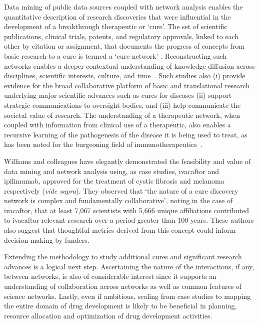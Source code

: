 \documentclass[10pt,letterpaper]{article}
\begin{document}
Data mining of public data sources coupled with network analysis enables the quantitative description of research discoveries that were influential in the development of a breakthrough therapeutic or `cure'.  The set of scientific publications, clinical trials, patents, and regulatory approvals, linked to each other by citation or assignment, that documents the progress of concepts from basic research to a cure is termed a `cure network' \cite {bibWilliams}. Reconstructing such networks enables a deeper contextual understanding of knowledge diffusion across disciplines, scientific interests, culture, and time~\cite{bibMaldame}. Such studies also (i) provide evidence for the broad collaborative platform of basic and translational research underlying major scientific advances such as cures for diseases \cite {bibLauer} (ii) support strategic communications to oversight bodies, and (iii) help communicate the societal value of research. The understanding of a therapeutic network, when coupled with information from clinical use of a therapeutic, also enables a recursive learning of the pathogenesis of the disease it is being used to treat, as has been noted for the burgeoning field of immunotherapeutics~\cite{bibChan}.  

Williams and colleagues have elegantly demonstrated the feasibility and value of data mining and network analysis using, as case studies, ivacaftor and ipilimumab, approved for the treatment of cystic fibrosis and melanoma respectively (\textit{vide supra}). They observed that `the nature of a cure discovery network is complex and fundamentally collaborative', noting in the case of ivacaftor, that at least 7,067 scientists with 5,666 unique affiliations contributed to ivacaftor-relevant research over a period greater than 100 years. These authors also suggest that thoughtful metrics derived from this concept could inform decision making by funders.

Extending the methodology to study additional cures and significant research advances is a logical next step. Ascertaining the nature of the interactions, if any, between networks, is also of considerable interest since it supports an understanding of collaboration across networks as well as common features of science networks. Lastly, even if ambitious, scaling from case studies to mapping the entire domain of drug development is likely to be beneficial in planning, resource allocation and optimization of drug development activities. 
\end{document}
